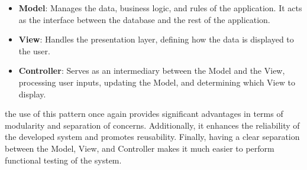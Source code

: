 			\begin{itemize}
				\item \textbf{Model}: Manages the data, business logic, and rules of the application. It acts as the interface between the database and the rest of the application.
				\item \textbf{View}: Handles the presentation layer, defining how the data is displayed to the user.
				\item \textbf{Controller}: Serves as an intermediary between the Model and the View, processing user inputs, updating the Model, and determining which View to display.
				
				
			\end{itemize}
			
			the use of this pattern once again provides significant advantages in terms of modularity and separation of concerns. Additionally, it enhances the reliability of the developed system and promotes reusability. Finally, having a clear separation between the Model, View, and Controller makes it much easier to perform functional testing of the system.
		
			
			
			
			
			
			
			
			
			
			
			